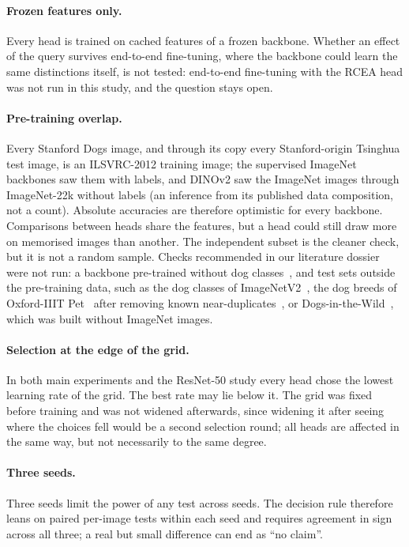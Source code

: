 \documentclass[11pt,a4paper]{article}
\theoremstyle{plain}
\begin{document}
\paragraph{Frozen features only.} Every head is trained on cached features of a frozen backbone. Whether an effect of
the query survives end-to-end fine-tuning, where the backbone could learn the same distinctions itself, is not
tested: end-to-end fine-tuning with the RCEA head was not run in this study, and the question stays open.

\paragraph{Pre-training overlap.} Every Stanford Dogs image, and through its copy every Stanford-origin Tsinghua test
image, is an ILSVRC-2012 training image; the supervised ImageNet backbones saw them with labels, and DINOv2 saw the
ImageNet images through ImageNet-22k without labels (an inference from its published data composition, not a count).
Absolute accuracies are therefore optimistic for every backbone. Comparisons between heads share the features, but a
head could still draw more on memorised images than another. The independent subset is the cleaner check, but it is
not a random sample. Checks recommended in our literature dossier were not run: a backbone pre-trained without dog
classes~\citep{krause2016unreasonable,zhang2018metafgnet}, and test sets outside the pre-training data, such as the
dog classes of ImageNetV2~\citep{recht2019imagenetv2}, the dog breeds of Oxford-IIIT Pet~\citep{parkhi2012catsdogs}
after removing known near-duplicates~\citep{kolesnikov2020bit}, or Dogs-in-the-Wild~\citep{sun2018mamc}, which was
built without ImageNet images.

\paragraph{Selection at the edge of the grid.} In both main experiments and the ResNet-50 study every head chose the
lowest learning rate of the grid. The best rate may lie below it. The grid was fixed before training and was not widened afterwards, since
widening it after seeing where the choices fell would be a second selection round; all heads are affected in the same
way, but not necessarily to the same degree.

\paragraph{Three seeds.} Three seeds limit the power of any test across seeds. The decision rule therefore leans on
paired per-image tests within each seed and requires agreement in sign across all three; a real but small difference
can end as ``no claim''.
\end{document}
